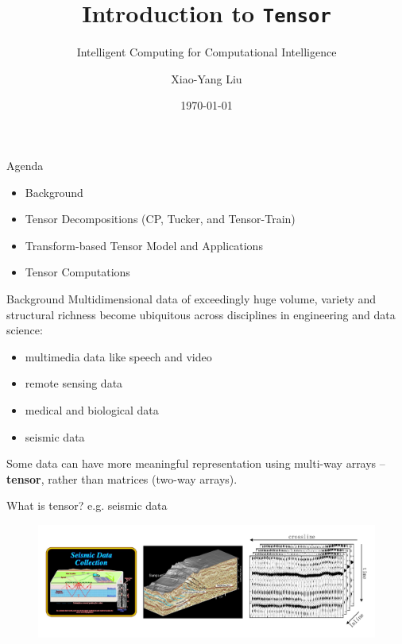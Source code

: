 \documentclass[t, 10pt, handout, aspectratio=169]{beamer}
\title[Introduction to Tensor]{Introduction to \texttt{Tensor}}
\subtitle{Intelligent Computing for Computational Intelligence}
\author[yanglet]{Xiao-Yang Liu}
\institute[CU]{Columbia University}
\date[\number\month/\number\day/\number\year]{\today}
\begin{document}
\begin{frame}
  \titlepage
\end{frame}

\begin{frame}{Agenda}
\begin{itemize}
    \large \item Background
    \large \item {Tensor Decompositions (CP, Tucker, and Tensor-Train)}
    \large \item{Transform-based Tensor Model and Applications}
    \large \item{Tensor Computations}
\end{itemize}
\end{frame}

\begin{frame}{Background}
\large Multidimensional data of exceedingly huge volume, variety and structural richness become ubiquitous across disciplines in engineering and data science:
\begin{itemize}
    \item multimedia data like speech and video
    \item remote sensing data
    \item medical and biological data
    \item seismic data
\end{itemize}
\margin
\large Some data can have more meaningful representation using multi-way arrays -- \textbf{tensor}, rather than matrices (two-way arrays).
\end{frame}


\begin{frame}{What is tensor?}
  \large e.g. seismic data
  
\begin{figure}
	\centering  
	\includegraphics[width=\linewidth]{figs/seismic_data}
	\label{fig:seismic_data}
\end{figure}

\end{frame}
\end{document}
